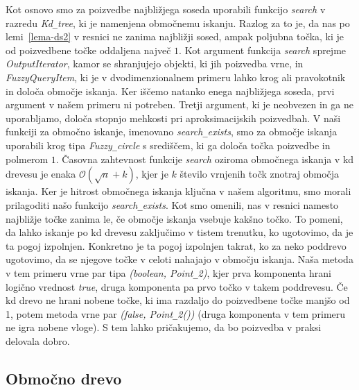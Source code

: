 \documentclass[a4paper, 12pt]{book}
\newcommand{\OO}{\ensuremath{\mathcal{O}}} %
\newcommand{\U}{\texttt{\_}}
\begin{document}
Kot osnovo smo za poizvedbe najbližjega soseda uporabili funkcijo \textit{search} v razredu \textit{Kd\U tree}, ki je namenjena območnemu iskanju. Razlog za to je, da nas po lemi~\ref{lema-ds2} v resnici ne zanima najbližji sosed, ampak poljubna točka, ki je od poizvedbene točke oddaljena največ $1$. Kot argument funkcija \textit{search} sprejme \textit{OutputIterator}, kamor se shranjujejo objekti, ki jih poizvedba vrne, in \textit{FuzzyQueryItem}, ki je v dvodimenzionalnem primeru lahko krog ali pravokotnik in določa območje iskanja. Ker iščemo natanko enega najbližjega soseda, prvi argument v našem primeru ni potreben. Tretji argument, ki je neobvezen in ga ne uporabljamo, določa stopnjo mehkosti pri aproksimacijskih poizvedbah. V naši funkciji za območno iskanje, imenovano \textit{search\U exists}, smo za območje iskanja uporabili krog tipa \textit{Fuzzy\U circle} s središčem, ki ga določa točka poizvedbe in polmerom $1$. Časovna zahtevnost funkcije \textit{search} oziroma območnega iskanja v kd drevesu je enaka $\OO(\sqrt{n} + k)$, kjer je $k$ število vrnjenih točk znotraj območja iskanja. Ker je hitrost območnega iskanja ključna v našem algoritmu, smo morali prilagoditi našo funkcijo \textit{search\U exists}. Kot smo omenili, nas v resnici namesto najbližje točke zanima le, če območje iskanja vsebuje kakšno točko. To pomeni, da lahko iskanje po kd drevesu zaključimo v tistem trenutku, ko ugotovimo, da je ta pogoj izpolnjen. Konkretno je ta pogoj izpolnjen takrat, ko za neko poddrevo ugotovimo, da se njegove točke v celoti nahajajo v območju iskanja. Naša metoda v tem primeru vrne par tipa \textit{(boolean, Point\U 2)}, kjer prva komponenta hrani logično vrednost \textit{true}, druga komponenta pa prvo točko v takem poddrevesu. Če kd drevo ne hrani nobene točke, ki ima razdaljo do poizvedbene točke manjšo od 1, potem metoda vrne par \textit{(false, Point\U 2())} (druga komponenta v tem primeru ne igra nobene vloge). S tem lahko pričakujemo, da bo poizvedba v praksi delovala dobro.

\subsection{Območno drevo}
\end{document}
